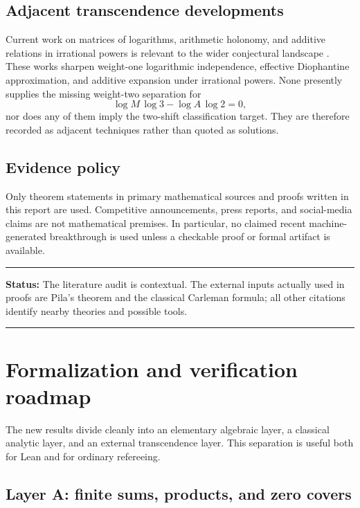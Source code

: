 \documentclass[11pt,oneside]{article}
\theoremstyle{definition}
\theoremstyle{remark}
\newenvironment{statusbox}[1]
{\begin{center}\begin{minipage}{0.94\textwidth}\raggedright\hrule\vspace{0.45em}\textbf{Status:} #1\par\vspace{0.35em}}
{\vspace{0.35em}\hrule\end{minipage}\end{center}}
\begin{document}
\subsection{Adjacent transcendence developments}

Current work on matrices of logarithms, arithmetic holonomy, and additive relations in
irrational powers is relevant to the wider conjectural landscape
\cite{Dasgupta2023,CDT2025,Harrison2026}.  These works sharpen weight-one logarithmic
independence, effective Diophantine approximation, and additive expansion under irrational
powers.  None presently supplies the missing weight-two separation for
\[
 \log M\,\log3-\log A\,\log2=0,
\]
nor does any of them imply the two-shift classification target.  They are therefore recorded
as adjacent techniques rather than quoted as solutions.

\subsection{Evidence policy}

Only theorem statements in primary mathematical sources and proofs written in this report
are used.  Competitive announcements, press reports, and social-media claims are not
mathematical premises.  In particular, no claimed recent machine-generated breakthrough is
used unless a checkable proof or formal artifact is available.

\begin{statusbox}{The literature audit is contextual.  The external inputs actually used in
proofs are Pila's theorem and the classical Carleman formula; all other citations identify
nearby theories and possible tools.}
\end{statusbox}

\section{Formalization and verification roadmap}
\label{sec:formalization}

The new results divide cleanly into an elementary algebraic layer, a classical analytic
layer, and an external transcendence layer.  This separation is useful both for Lean and for
ordinary refereeing.

\subsection{Layer A: finite sums, products, and zero covers}
\end{document}
